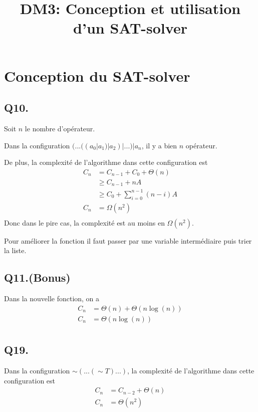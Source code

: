 

\title{DM3: Conception et utilisation d’un SAT-solver}
\author{}
\date{}



    \maketitle
    \section{Conception du SAT-solver}
    \subsection*{Q10.}
    Soit $n$ le nombre d'opérateur.
    
    Dans la configuration $(...((a_0 | a_1) | a_2) | ...) | a_n$,
    il y a bien $n$ opérateur.
    
    De plus, la complexité de l'algorithme dans cette configuration est
    \begin{align*}
        C_n &= C_{n-1} + C_0 + \Theta(n)\\
        &\geq C_{n-1} + nA\\
        &\geq C_0 + \sum_{i=0}^{n-1}(n-i)A\\
        C_n &= \boxed{\Omega(n^2)}\\
    \end{align*}
    Donc dans le pire cas, la complexité est au moins en $\Omega(n^2)$.
    
    Pour améliorer la fonction
    il faut passer par une variable intermédiaire puis trier la liste.
    
    \subsection*{Q11.(Bonus)}
    Dans la nouvelle fonction, on a
    \begin{align*}
        C_n &= \Theta(n) + \Theta(n\log(n))\\
        C_n &= \boxed{\Theta(n\log(n))}\\
    \end{align*}
    
    \subsection*{Q19.}
    Dans la configuration $\sim(...(\sim T)...)$, 
    la complexité de l'algorithme dans cette configuration est
    \begin{align*}
        C_n &= C_{n-2} + \Theta(n)\\
        C_n &= \boxed{\Theta(n^2)}\\
    \end{align*}
    

